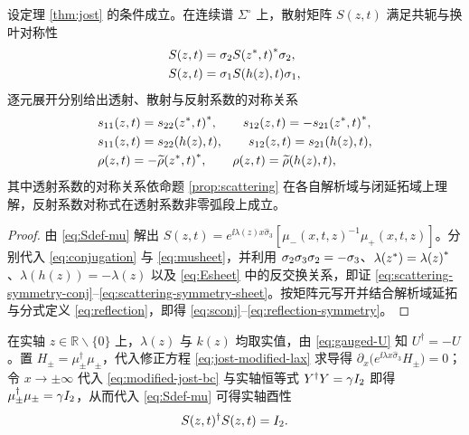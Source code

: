 \begin{proposition}\label{prop:scattering-symmetry}
设定理 \ref{thm:jost} 的条件成立。在连续谱 $\Sigma^\circ$ 上，散射矩阵 $S(z,t)$ 满足共轭与换叶对称性
\begin{align}
&S(z,t)=\sigma_2{S({z}^{*},t)}^{*}\sigma_2,\label{eq:scattering-symmetry-conj}\\
&S(z,t)=\sigma_1S(h(z),t)\sigma_1,\label{eq:scattering-symmetry-sheet}
\end{align}
逐元展开分别给出透射、散射与反射系数的对称关系
\begin{align}
&s_{11}(z,t)={s_{22}({z}^{*},t)}^{*},\qquad
s_{12}(z,t)=-{s_{21}({z}^{*},t)}^{*},\label{eq:sconj}\\
&s_{11}(z,t)=s_{22}(h(z),t),\qquad
s_{12}(z,t)=s_{21}(h(z),t),\label{eq:ssheet}\\
&\rho(z,t)=-{\widetilde\rho({z}^{*},t)}^{*},\qquad
\rho(z,t)=\widetilde\rho(h(z),t),\label{eq:reflection-symmetry}
\end{align}
其中透射系数的对称关系依命题 \ref{prop:scattering} 在各自解析域与闭延拓域上理解，反射系数对称式在透射系数非零弧段上成立。
\end{proposition}
\begin{proof}
由 \eqref{eq:Sdef-mu} 解出 $S(z,t)=e^{\ii\lambda(z)x\widehat{\sigma}_3}\!\left[\mu_-(x,t,z)^{-1}\mu_+(x,t,z)\right]$。分别代入 \eqref{eq:conjugation} 与 \eqref{eq:musheet}，并利用 $\sigma_2\sigma_3\sigma_2=-\sigma_3$、$\lambda({z}^{*})={\lambda(z)}^{*}$、$\lambda(h(z))=-\lambda(z)$ 以及 \eqref{eq:Esheet} 中的反交换关系，即证 \eqref{eq:scattering-symmetry-conj}--\eqref{eq:scattering-symmetry-sheet}。按矩阵元写开并结合解析域延拓与分式定义 \eqref{eq:reflection}，即得 \eqref{eq:sconj}--\eqref{eq:reflection-symmetry}。
\end{proof}

\begin{remark}
在实轴 $z\in\mathbb R\mathbin{\backslash}\{0\}$ 上，$\lambda(z)$ 与 $k(z)$ 均取实值，由 \eqref{eq:gauged-U} 知 $U^\dagger=-U$。置 $H_\pm=\mu_\pm^\dagger\mu_\pm$，代入修正方程 \eqref{eq:jost-modified-lax} 求导得 $\partial_x\bigl(e^{\ii\lambda x\widehat{\sigma}_3}H_\pm\bigr)=0$；令 $x\to\pm\infty$ 代入 \eqref{eq:modified-jost-bc} 与实轴恒等式 $Y^\dagger Y=\gamma I_2$ 即得 $\mu_\pm^\dagger\mu_\pm=\gamma I_2$，从而代入 \eqref{eq:Sdef-mu} 可得实轴酉性
\begin{equation}\label{eq:scattering-unitarity}
S(z,t)^\dagger S(z,t)=I_2.
\end{equation}
\end{remark}

